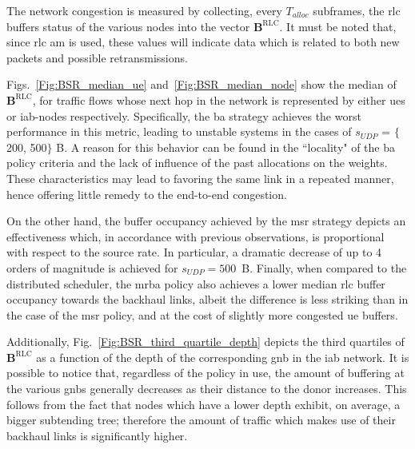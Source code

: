 The network congestion is measured by collecting, every $T_{alloc}$ subframes, the \gls{rlc} buffers status of the various nodes into the vector $\mathbf{B}^{\mathrm{RLC}}$. It must be noted that, since \gls{rlc} \gls{am} is used, these values will indicate data which is related to both new packets and possible retransmissions.

Figs.~\ref{Fig:BSR_median_ue} and~\ref{Fig:BSR_median_node} show the median of $\mathbf{B}^{\mathrm{RLC}}$, for traffic flows whose next hop in the network is represented by either \glspl{ue} or \gls{iab}-nodes respectively. Specifically, the \gls{ba} strategy achieves the worst performance in this metric, leading to unstable systems in the cases of $s_{UDP}$ = $\{$200, 500$\}$ B. 
A reason for this behavior can be found in the ``locality" of the \gls{ba} policy criteria and the lack of influence of the past allocations on the weights. These characteristics may lead to favoring the same link in a repeated manner, hence offering little remedy to the end-to-end congestion.

On the other hand, the buffer occupancy achieved by the \gls{msr} strategy depicts an effectiveness which, in accordance with previous observations, is proportional with respect to the source rate. In particular, a dramatic decrease of up to 4 orders of magnitude is achieved for $s_{UDP} = 500$~B.
Finally, when compared to the distributed scheduler, the \gls{mrba} policy also achieves a lower median \gls{rlc} buffer occupancy towards the backhaul links, albeit the difference is less striking than in the case of the \gls{msr} policy, and at the cost of slightly more congested \gls{ue} buffers. 

Additionally, Fig.~\ref{Fig:BSR_third_quartile_depth} depicts the third quartiles of $\mathbf{B}^{\mathrm{RLC}}$ as a function of the depth of the corresponding \gls{gnb} in the \gls{iab} network. It is possible to notice that, regardless of the policy in use, the amount of buffering at the various \glspl{gnb} generally decreases as their distance to the donor increases. This follows from the fact that nodes which have a lower depth exhibit, on average, a bigger subtending tree; therefore the amount of traffic which makes use of their backhaul links is significantly higher.

